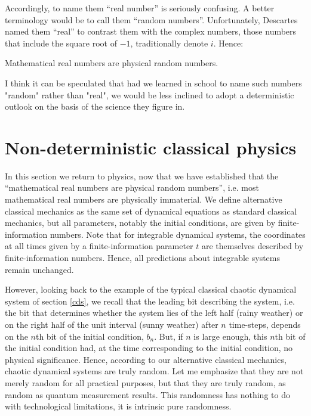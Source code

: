 \documentclass[pra,aps,groupedaddress,twocolumn,floatfix,nofootinbib]{revtex4}
\begin{document}
Accordingly, to name them ``real number'' is seriously confusing. A better terminology would be to call them ``random numbers''. Unfortunately, Descartes named them ``real'' to contrast them with the complex numbers, those numbers that include the square root of $-1$, traditionally denote $i$. Hence:

Mathematical real numbers are physical random numbers.

I think it can be speculated that had we learned in school to name such numbers "random" rather than "real", we would be less inclined to adopt a deterministic outlook on the basis of the science they figure in. 


\section{Non-deterministic classical physics}\label{ndcm}
In this section we return to physics, now that we have established that the ``mathematical real numbers are physical random numbers'', i.e. most mathematical real numbers are physically immaterial. We define alternative classical mechanics as the same set of dynamical equations as standard classical mechanics, but all parameters, notably the initial conditions, are given by finite-information numbers. Note that for integrable dynamical systems, the coordinates at all times given by a finite-information parameter $t$ are themselves described by finite-information numbers. Hence, all predictions about integrable systems remain unchanged.

However, looking back to the example of the typical classical chaotic dynamical system of section \ref{cds}, we recall that the leading bit describing the system, i.e. the bit that determines whether the system lies of the left half (rainy weather) or on the right half of the unit interval (sunny weather) after $n$ time-steps, depends on the $n$th bit of the initial condition, $b_n$. But, if $n$ is large enough, this $n$th bit of the initial condition had, at the time corresponding to the initial condition, no physical significance. Hence, according to our alternative classical mechanics, chaotic dynamical systems are truly random. Let me emphasize that they are not merely random for all practical purposes, but that they are truly random, as random as quantum measurement results. This randomness has nothing to do with technological limitations, it is intrinsic pure randomness.
\end{document}
